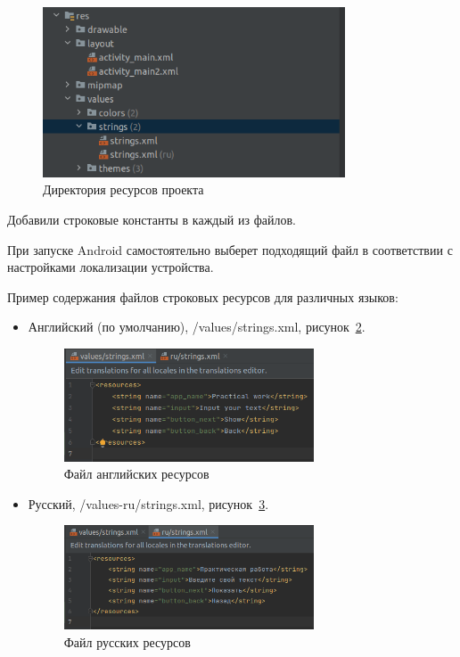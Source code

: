 \begin{figure}[h!tp]
	\centering
	\includegraphics[width=0.8\textwidth]{Screenshot from 2023-02-20 18-03-12.png}
	\caption{Директория ресурсов проекта}
	\label{fig:res:values}
\end{figure}

Добавили строковые константы в каждый из файлов.\par
При запуске Android самостоятельно выберет подходящий файл в
соответствии с настройками локализации устройства.\par
Пример содержания файлов строковых ресурсов для различных
языков:
\begin{itemize}
	\item Английский (по умолчанию), /values/strings.xml,
		рисунок~\ref{fig:res:values:en}.
		\begin{figure}[h!tp]
			\centering
			\includegraphics[width=0.7\textwidth]{Screenshot from 2023-02-20 18-13-18.png}
			\caption{Файл английских ресурсов}
			\label{fig:res:values:en}
		\end{figure}
	\item Русский, /values-ru/strings.xml,
		рисунок~\ref{fig:res:values:ru}.
		\begin{figure}[h!tp]
			\centering
			\includegraphics[width=0.7\textwidth]{Screenshot from 2023-02-20 18-13-33.png}
			\caption{Файл русских ресурсов}
			\label{fig:res:values:ru}
		\end{figure}
\end{itemize}

